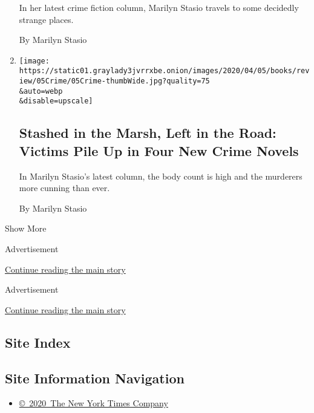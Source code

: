\begin{enumerate}
  In her latest crime fiction column, Marilyn Stasio travels to some
  decidedly strange places.

  By Marilyn Stasio
\item
  \href{/2020/04/03/books/review/crime-fiction-peter-swanson-eight-perfect-murders.html}{}

  \texttt{[image: https://static01.graylady3jvrrxbe.onion/images/2020/04/05/books/review/05Crime/05Crime-thumbWide.jpg?quality=75\\\&auto=webp\\\&disable=upscale]}

  \hypertarget{stashed-in-the-marsh-left-in-the-road-victims-pile-up-in-four-new-crime-novels}{%
  \subsection{Stashed in the Marsh, Left in the Road: Victims Pile Up in
  Four New Crime
  Novels}\label{stashed-in-the-marsh-left-in-the-road-victims-pile-up-in-four-new-crime-novels}}

  In Marilyn Stasio's latest column, the body count is high and the
  murderers more cunning than ever.

  By Marilyn Stasio
\end{enumerate}

Show More

Advertisement

\protect\hyperlink{after-mid1}{Continue reading the main story}

Advertisement

\protect\hyperlink{after-mktg}{Continue reading the main story}

\hypertarget{site-index}{%
\subsection{Site Index}\label{site-index}}

\hypertarget{site-information-navigation}{%
\subsection{Site Information
Navigation}\label{site-information-navigation}}

\begin{itemize}
\tightlist
\item
  \href{https://help.nytimes3xbfgragh.onion/hc/en-us/articles/115014792127-Copyright-notice}{©~2020~The
  New York Times Company}
\end{itemize}

